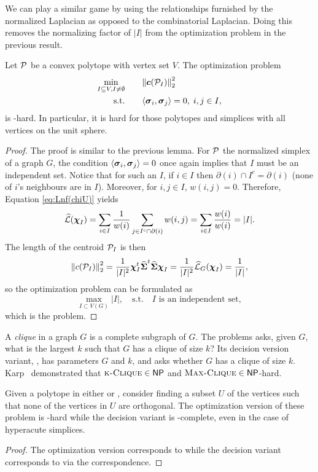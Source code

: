 We can play a similar game by using the relationships furnished by the normalized Laplacian as opposed to the combinatorial Laplacian. Doing this removes the normalizing factor of $|I|$ from the optimization problem in the previous result.  

\begin{lemma}
	Let $\P$ be a convex polytope with vertex set $V$. The optimization problem
	\begin{alignat*}{2}
	\min_{I\subset V, I\neq \emptyset} & \quad &&  {\norm{\cent(\P_I)}_2^2} \\
	\text{s.t.}&  &&  \la \sv_i,\sv_j\ra=0,\; i,j\in I,
	\end{alignat*}
	is \NP-hard. In particular, it is hard for those polytopes and simplices with all vertices on the unit sphere. 
\end{lemma}
\begin{proof}
	The proof is similar to the previous lemma. For $\P$ the normalized simplex of a graph $G$, the condition $\la \sv_i,\sv_j\ra=0$ once again implies that $I$ must be an independent set. Notice that for such an $I$, if $i\in I$ then $\partial(i) \cap I^c = \partial(i)$ (none of $i$'s neighbours are in $I$). Moreover, for $i,j\in I$, $w(i,j)=0$.  Therefore, Equation \eqref{eq:Lnf(chiU)} yields 
	\begin{align*}
	\Lnf(\bchi_I)=\sum_{i\in I}\frac{1}{w(i)}\sum_{j\in I^c\cap \partial(i)} w(i,j) = \sum_{i\in I}\frac{w(i)}{w(i)} = |I|.
	\end{align*}
	The  length  of the centroid  $\P_I$  is  then 
	\begin{align*}
	\norm{c(\P_I)}_2^2=\frac{1}{|I|^2}\bchi_I^\tp\Svn^\tp\Svn\bchi_I= \frac{1}{|I|^2}\Lnf_G(\bchi_I) =\frac{1}{|I|},
	\end{align*} 
	so the optimization problem can be formulated as 
	\[\max_{I\subset V(G)} |I|,\quad  \text{s.t.} \quad I \text{ is an independent set},\]
	which is the \iset problem. 
\end{proof}

A \emph{clique} in a graph $G$ is a complete subgraph of $G$. The \maxclique problems asks, given  $G$, what is the  largest  $k$ such that $G$ has a clique of size $k$? Its decision version variant, \kclique, has parameters $G$ and $k$, and asks whether $G$ has a clique of size $k$. Karp~\cite{karp1972reducibility} demonstrated that $\kclique\in\NP$ and $\maxclique\in\NP$-hard.  

\begin{lemma}
	Given a polytope in either  \vdesc or \hdesc, consider finding a subset $U$ of the vertices such that none of the vertices in $U$ are orthogonal. The optimization version  of these problem is \NP-hard  while the  decision variant is \NP-complete, even in the case of hyperacute simplices. 
\end{lemma}
\begin{proof}
	The optimization version corresponds to \maxclique while the decision variant corresponds to \kclique via the correspondence.   
\end{proof}



